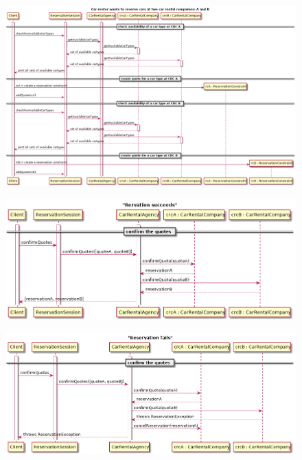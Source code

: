\documentclass{ds-report}
\begin{document}
\clearpage
	\begin{landscape}
		\begin{figure}
			\centering
			\includegraphics[width=\paperwidth]{../diagrams/sequenceDiagrams/reserveCars.png}
		\end{figure}
	\end{landscape}
	
\clearpage
	\begin{landscape}
		\begin{figure}
			\centering
			\includegraphics[width=\paperwidth]{../diagrams/sequenceDiagrams/reservationSucceeds.png}
		\end{figure}
	\end{landscape}
\clearpage
	\begin{landscape}
		\begin{figure}
			\centering
			\includegraphics[width=\paperwidth]{../diagrams/sequenceDiagrams/reservationFails.png}
		\end{figure}
	\end{landscape}
\end{document}

